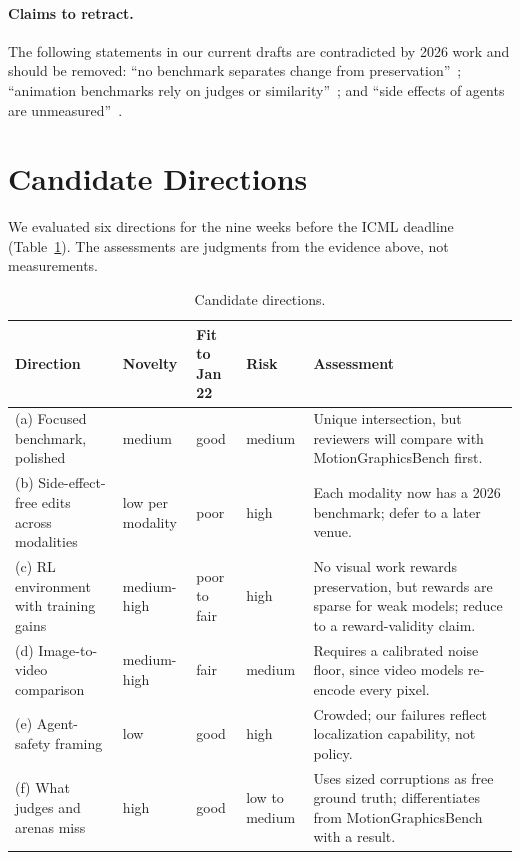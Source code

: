 \documentclass[11pt]{article}
\begin{document}
\paragraph{Claims to retract.} The following statements in our current drafts are contradicted by 2026 work and should be removed: ``no benchmark separates change from preservation''~\citep{gupta2026vectorbench,li2026mtweb2code,huang2026sabench,minar2026snfbench}; ``animation benchmarks rely on judges or similarity''~\citep{ma2026motiongraphicsbench,ma2025mover}; and ``side effects of agents are unmeasured''~\citep{pysklo2026agentdiff,huang2026sabench}.

\section{Candidate Directions}
\label{sec:rec}

We evaluated six directions for the nine weeks before the ICML deadline (Table~\ref{tab:dir}). The assessments are judgments from the evidence above, not measurements.

\begin{table}[t]
\centering
\small
\setlength{\tabcolsep}{3pt}
\begin{tabularx}{\linewidth}{>{\raggedright\arraybackslash}p{4.2cm}lll>{\raggedright\arraybackslash}X}
\toprule
Direction & Novelty & Fit to Jan 22 & Risk & Assessment \\
\midrule
(a) Focused benchmark, polished & medium & good & medium & Unique intersection, but reviewers will compare with MotionGraphicsBench first. \\
(b) Side-effect-free edits across modalities & low per modality & poor & high & Each modality now has a 2026 benchmark; defer to a later venue. \\
(c) RL environment with training gains & medium-high & poor to fair & high & No visual work rewards preservation, but rewards are sparse for weak models; reduce to a reward-validity claim. \\
(d) Image-to-video comparison & medium-high & fair & medium & Requires a calibrated noise floor, since video models re-encode every pixel. \\
(e) Agent-safety framing & low & good & high & Crowded; our failures reflect localization capability, not policy. \\
(f) What judges and arenas miss & high & good & low to medium & Uses sized corruptions as free ground truth; differentiates from MotionGraphicsBench with a result. \\
\bottomrule
\end{tabularx}
\caption{Candidate directions.}
\label{tab:dir}
\end{table}
\end{document}

